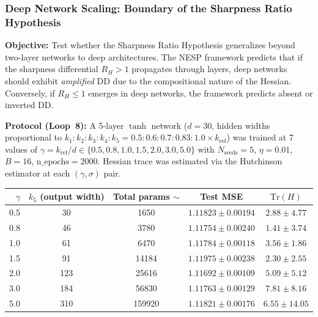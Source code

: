 \documentclass[
  journal=largetwo,
  simfonts=false,
  year=2025,
  volume=37,
]{cup-journal}
\begin{document}
\subsubsection{Deep Network Scaling: Boundary of the Sharpness Ratio Hypothesis}\label{sec:deep_scaling}

\textbf{Objective:} Test whether the Sharpness Ratio Hypothesis generalizes beyond two-layer networks to deep architectures. The NESP framework predicts that if the sharpness differential $R_H > 1$ propagates through layers, deep networks should exhibit \emph{amplified} DD due to the compositional nature of the Hessian. Conversely, if $R_H \leq 1$ emerges in deep networks, the framework predicts absent or inverted DD.

\textbf{Protocol (Loop~8):} A 5-layer $\tanh$ network ($d=30$, hidden widths proportional to $k_1{:}k_2{:}k_3{:}k_4{:}k_5 = 0.5{:}0.6{:}0.7{:}0.83{:}1.0 \times k_{\mathrm{ref}}$) was trained at 7 values of $\gamma = k_{\mathrm{ref}}/d \in \{0.5, 0.8, 1.0, 1.5, 2.0, 3.0, 5.0\}$ with $N_{\mathrm{seeds}}=5$, $\eta=0.01$, $B=16$, $\mathrm{n\_epochs}=2000$. Hessian trace was estimated via the Hutchinson estimator at each $(\gamma, \sigma)$ pair.

\begin{table}
    \begin{tabular}{ rcccc }
\toprule
$\gamma$ & $k_5$ (output width) & Total params $\sim$ & Test MSE & $\mathrm{Tr}(H)$ \\
\midrule
0.5  & 30  & 1650  & $1.11823 \pm 0.00194$ & $2.88 \pm 4.77$ \\
0.8  & 46  & 3780  & $1.11754 \pm 0.00240$ & $1.41 \pm 3.74$ \\
1.0  & 61  & 6470  & $1.11784 \pm 0.00118$ & $3.56 \pm 1.86$ \\
1.5  & 91  & 14184 & $1.11975 \pm 0.00238$ & $2.30 \pm 2.55$ \\
2.0  & 123 & 25616 & $1.11692 \pm 0.00109$ & $5.09 \pm 5.12$ \\
3.0  & 184 & 56830 & $1.11763 \pm 0.00129$ & $7.81 \pm 8.16$ \\
5.0  & 310 & 159920& $1.11821 \pm 0.00176$ & $6.55 \pm 14.05$ \\
\bottomrule
\end{tabular}
\end{table}
\end{document}
